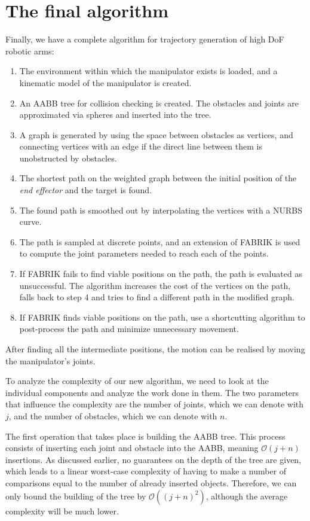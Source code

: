 \section{The final algorithm}

Finally, we have a complete algorithm for trajectory generation of high DoF robotic arms:

\begin{enumerate}
\item The environment within which the manipulator exists is loaded, and a kinematic model of the manipulator is created.
\item An AABB tree for collision checking is created. The obstacles and joints are approximated via spheres and inserted into the tree.
\item A graph is generated by using the space between obstacles as vertices, and connecting vertices with an edge if the direct line between them is unobstructed by obstacles.
\item The shortest path on the weighted graph between the initial position of the \textit{end effector} and the target is found.
\item The found path is smoothed out by interpolating the vertices with a NURBS curve.
\item The path is sampled at discrete points, and an extension of FABRIK is used to compute the joint parameters needed to reach each of the points.
\item If FABRIK fails to find viable positions on the path, the path is evaluated as unsuccessful. The algorithm increases the cost of the vertices on the path, falls back to step 4 and tries to find a different path in the modified graph.
\item If FABRIK finds viable positions on the path, use a shortcutting algorithm to post-process the path and minimize unnecessary movement.
\end{enumerate}

After finding all the intermediate positions, the motion can be realised by moving the manipulator's joints.

To analyze the complexity of our new algorithm, we need to look at the individual components and analyze the work done in them. The two parameters that influence the complexity are the number of joints, which we can denote with $j$, and the number of obstacles, which we can denote with $n$.

The first operation that takes place is building the AABB tree. This process consists of inserting each joint and obstacle into the AABB, meaning $\mathcal{O}(j + n)$ insertions. As discussed earlier, no guarantees on the depth of the tree are given, which leads to a linear worst-case complexity of having to make a number of comparisons equal to the number of already inserted objects. Therefore, we can only bound the building of the tree by $\mathcal{O}({(j+n)}^2)$, although the average complexity will be much lower.

